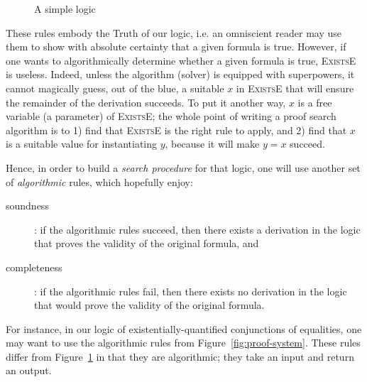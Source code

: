 \documentclass{easychair}
\let\Rule\textsc
\newcommand{\fref}[1]{Figure~\ref{fig:#1}}
\begin{document}
\begin{figure}
  \centering
  \begin{mathpar}


  \end{mathpar}
  \caption{A simple logic}
  \label{fig:logic}
\end{figure}

These rules embody the Truth of our logic, i.e. an omniscient reader may use
them to show with absolute certainty that a given formula is true.
%
However, if one wants to algorithmically determine whether a given formula is
true, \Rule{ExistsE} is useless. Indeed, unless the algorithm (solver) is
equipped with superpowers, it cannot magically guess, out of the blue, a
suitable $x$ in \Rule{ExistsE} that will ensure the remainder of the derivation
succeeds. To put it another way, $x$ is a free variable (a parameter) of
\Rule{ExistsE}; the whole point of writing a proof search algorithm is to 1)
find that \Rule{ExistsE} is the right rule to apply, and 2) find that $x$ is a
suitable value for instantiating $y$, because it will make $y = x$ succeed.

Hence, in order to build a \emph{search procedure} for that logic, one will
use another set of \emph{algorithmic} rules, which hopefully enjoy:
\begin{description}
  \item[soundness]: if the algorithmic rules succeed, then there exists a
    derivation in the logic that proves the validity of the original formula,
    and
  \item[completeness]: if the algorithmic rules fail, then there exists no
    derivation in the logic that would prove the validity of the original
    formula.
\end{description}

For instance, in our logic of existentially-quantified conjunctions of
equalities, one may want to use the algorithmic rules from
\fref{proof-system}. These rules differ from \fref{logic} in that they are
algorithmic; they take an input and return an output.
\end{document}
